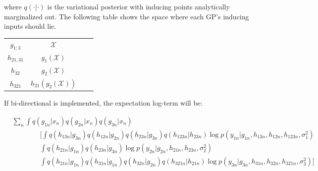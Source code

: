 \documentclass{article}
\begin{document}
where $q(\cdot|\cdot)$ is the variational posterior with inducing points analytically marginalized out. The following table shows the space where each GP's inducing inputs should lie.

\begin{table}[H]
\centering
\begin{tabular}{|c|c|c|c|}
\hline
$g_{1:3}$ & $\mathcal{X}$\\
$h_{21,31}$ & $g_1(\mathcal{X})$\\
$h_{32}$ & $g_2(\mathcal{X})$\\
$h_{321}$ & $h_{21}(g_2(\mathcal{X}))$\\
\hline
\end{tabular}
\end{table}

If bi-directional is implemented, the expectation log-term will be:

\begin{align*}
	& \sum_n \int q(g_{1n}|x_n)q(g_{2n}|x_n)q(g_{3n}|x_n)\\
	& \hspace{4em} \bigg[ \int  q(h_{13n}|g_{3n}) q(h_{12n}|g_{2n}) q(h_{23n}|g_{3n}) q(h_{123n}|h_{23n}) \log p(y_{1n}|g_{1n}, h_{13n}, h_{12n}, h_{123n}, \sigma_1^2)\\
	& \hspace{4em} \int q(h_{21n}|g_{1n}) q(h_{23n}|g_{3n}) \log p(y_{2n}|g_{2n}, h_{21n}, h_{23n}, \sigma^2_2)\\
	& \hspace{4em} \int q(h_{21n}|g_{1n}) q(h_{31n}|g_{1n}) q(h_{32n}|g_{2n}) q(h_{321n}|h_{21n}) \log p(y_{3n}| g_{3n}, h_{31n}, h_{32n}, h_{321n}, \sigma^2_3) \bigg]
\end{align*}
\end{document}
